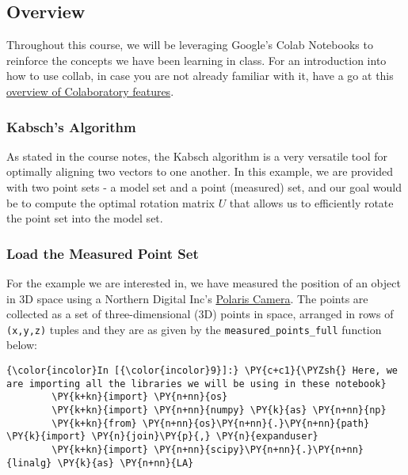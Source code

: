     \geometry{verbose,tmargin=1in,bmargin=1in,lmargin=1in,rmargin=1in}
    
    

    
    
    
    \maketitle
    
    

    
    \subsection{Overview}\label{overview}

Throughout this course, we will be leveraging Google's Colab Notebooks
to reinforce the concepts we have been learning in class. For an
introduction into how to use collab, in case you are not already
familiar with it, have a go at this
\href{https://colab.research.google.com/notebooks/basic_features_overview.ipynb\#scrollTo=Id6tDF1HQSHD}{overview
of Colaboratory features}.

    \subsubsection{Kabsch's Algorithm}\label{kabschs-algorithm}

As stated in the course notes, the Kabsch algorithm is a very versatile
tool for optimally aligning two vectors to one another. In this example,
we are provided with two point sets - a model set and a point (measured)
set, and our goal would be to compute the optimal rotation matrix \(U\)
that allows us to efficiently rotate the point set into the model set.

    \subsubsection{Load the Measured Point
Set}\label{load-the-measured-point-set}

For the example we are interested in, we have measured the position of
an object in 3D space using a Northern Digital Inc's
\href{https://www.ndigital.com/products/}{Polaris Camera}. The points
are collected as a set of three-dimensional (3D) points in space,
arranged in rows of \texttt{(x,y,z)} tuples and they are as given by the
\texttt{measured\_points\_full} function below:

    \begin{Verbatim}[commandchars=\\\{\}]
{\color{incolor}In [{\color{incolor}9}]:} \PY{c+c1}{\PYZsh{} Here, we are importing all the libraries we will be using in these notebook}
        \PY{k+kn}{import} \PY{n+nn}{os}
        \PY{k+kn}{import} \PY{n+nn}{numpy} \PY{k}{as} \PY{n+nn}{np}
        \PY{k+kn}{from} \PY{n+nn}{os}\PY{n+nn}{.}\PY{n+nn}{path} \PY{k}{import} \PY{n}{join}\PY{p}{,} \PY{n}{expanduser}
        \PY{k+kn}{import} \PY{n+nn}{scipy}\PY{n+nn}{.}\PY{n+nn}{linalg} \PY{k}{as} \PY{n+nn}{LA}
\end{Verbatim}


